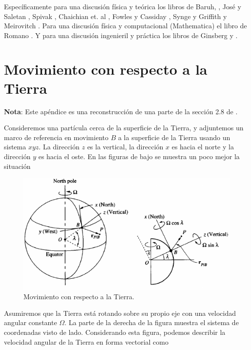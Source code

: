 \documentclass[a4paper,10pt]{article}
\numberwithin{equation}{section}
\begin{document}
Específicamente para una discusión física y teórica los libros de 
Baruh, \cite{baruh}, José y Saletan \cite{saletan}, Spivak \cite{spivak},
Chaichian et. al \cite{chaichian}, Fowles y Cassiday \cite{fowles}, Synge y Griffith \cite{synge} y Meirovitch \cite{meirovitch}. 
Para una discusión física y computacional (Mathematica) el libro de Romano \cite{romano}. Y para una discusión ingenieril y práctica los 
libros de Ginsberg \cite{ginsberg1} y \cite{ginsberg2}.

\newpage

\appendix
\appendixpage

\section{Movimiento con respecto a la Tierra} \label{app:apendice1}

\textbf{Nota}: Este apéndice es una reconstrucción de una parte de la sección 2.8 
de \cite{baruh}. 

\vspace{.3cm}

Consideremos una partícula cerca de la superficie de la Tierra, y adjuntemos un marco 
de referencia en movimiento $B$ a la superficie de la Tierra usando un sistema 
$xyz$. La dirección $z$ es la vertical, la dirección $x$ es hacia el norte y la 
dirección $y$ es hacia el oste. En las figuras de bajo se muestra un poco mejor 
la situación

\begin{figure}[H]
 \center
 \includegraphics[scale=0.7]{apendice1fig1}
 \caption{Movimiento con respecto a la Tierra.}
  \label{fig:apendice1fig1}
\end{figure}

Asumiremos que la Tierra está rotando sobre su propio eje con una velocidad angular 
constante $\Omega$. La parte de la derecha de la figura  
muestra el sistema de coordenadas visto de lado. Considerando esta figura, podemos 
describir la velocidad angular de la Tierra en forma vectorial como
\end{document}
